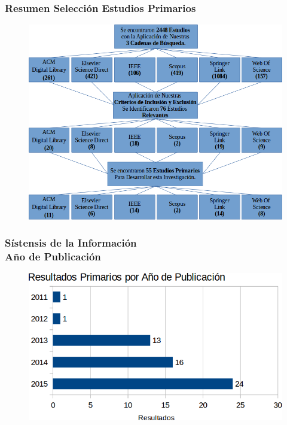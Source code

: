 \documentclass{beamer}
\begin{document}
\begin{frame}
	\frametitle{Resumen Selección Estudios Primarios}
	\begin{figure}
		\begin{center}
			\includegraphics[scale=0.35]{images/1document/results.png}
		\end{center}
	\end{figure}
\end{frame}

\begin{frame}
    \frametitle{Sístensis de la Información\\ Año de Publicación}
	\begin{figure}
		\begin{center}
			\includegraphics[scale=0.4]{images/1document/PrimariosAnio.png}
		\end{center}
	\end{figure}
\end{frame}
\end{document}
